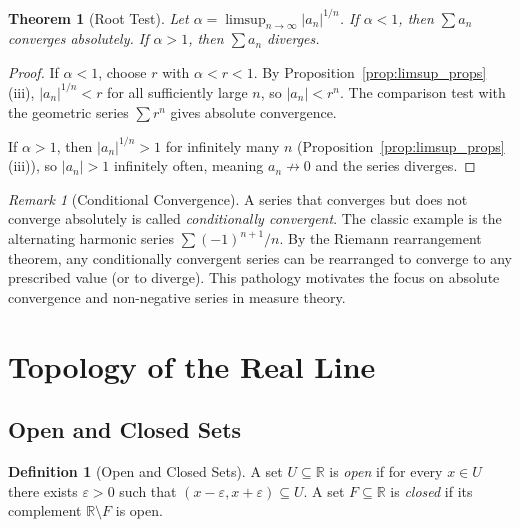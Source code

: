 \documentclass[11pt,a4paper]{article}
\theoremstyle{definition}
\newtheorem{definition}{Definition}[section]
\theoremstyle{plain}
\newtheorem{theorem}{Theorem}[section]
\theoremstyle{remark}
\newtheorem{remark}{Remark}[section]
\newcommand{\R}{\mathbb{R}}
\begin{document}
\begin{theorem}[Root Test]
\label{thm:root}
Let $\alpha = \limsup_{n\to\infty} |a_n|^{1/n}$. If $\alpha < 1$, then
$\sum a_n$ converges absolutely. If $\alpha > 1$, then $\sum a_n$ diverges.
\end{theorem}

\begin{proof}
If $\alpha < 1$, choose $r$ with $\alpha < r < 1$. By
Proposition~\ref{prop:limsup_props}(iii), $|a_n|^{1/n} < r$ for all
sufficiently large $n$, so $|a_n| < r^n$. The comparison test with the geometric
series $\sum r^n$ gives absolute convergence.

If $\alpha > 1$, then $|a_n|^{1/n} > 1$ for infinitely many $n$
(Proposition~\ref{prop:limsup_props}(iii)), so $|a_n| > 1$ infinitely often,
meaning $a_n \not\to 0$ and the series diverges.
\end{proof}

\begin{remark}[Conditional Convergence]
\label{rem:conditional}
A series that converges but does not converge absolutely is called
\emph{conditionally convergent}. The classic example is the alternating harmonic
series $\sum (-1)^{n+1}/n$. By the Riemann rearrangement theorem, any
conditionally convergent series can be rearranged to converge to any prescribed
value (or to diverge). This pathology motivates the focus on absolute convergence
and non-negative series in measure theory.
\end{remark}

\section{Topology of the Real Line}
\label{sec:topology}

\subsection{Open and Closed Sets}
\label{subsec:open_closed}

\begin{definition}[Open and Closed Sets]
\label{def:open_closed}
A set $U \subseteq \R$ is \emph{open} if for every $x \in U$ there exists
$\varepsilon > 0$ such that $(x - \varepsilon, x + \varepsilon) \subseteq U$.
A set $F \subseteq \R$ is \emph{closed} if its complement $\R \setminus F$ is
open.
\end{definition}
\end{document}
